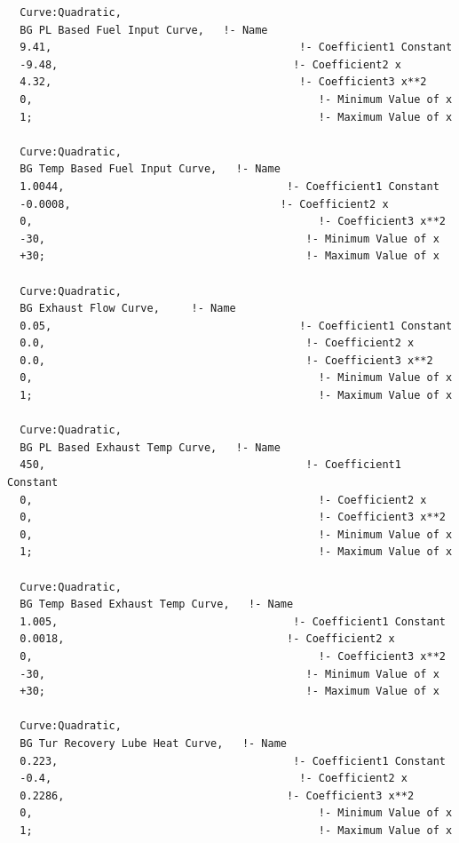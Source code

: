 \begin{lstlisting}
  Curve:Quadratic,
  BG PL Based Fuel Input Curve,   !- Name
  9.41,                                       !- Coefficient1 Constant
  -9.48,                                     !- Coefficient2 x
  4.32,                                       !- Coefficient3 x**2
  0,                                             !- Minimum Value of x
  1;                                             !- Maximum Value of x

  Curve:Quadratic,
  BG Temp Based Fuel Input Curve,   !- Name
  1.0044,                                   !- Coefficient1 Constant
  -0.0008,                                 !- Coefficient2 x
  0,                                             !- Coefficient3 x**2
  -30,                                         !- Minimum Value of x
  +30;                                         !- Maximum Value of x

  Curve:Quadratic,
  BG Exhaust Flow Curve,     !- Name
  0.05,                                       !- Coefficient1 Constant
  0.0,                                         !- Coefficient2 x
  0.0,                                         !- Coefficient3 x**2
  0,                                             !- Minimum Value of x
  1;                                             !- Maximum Value of x

  Curve:Quadratic,
  BG PL Based Exhaust Temp Curve,   !- Name
  450,                                         !- Coefficient1 Constant
  0,                                             !- Coefficient2 x
  0,                                             !- Coefficient3 x**2
  0,                                             !- Minimum Value of x
  1;                                             !- Maximum Value of x

  Curve:Quadratic,
  BG Temp Based Exhaust Temp Curve,   !- Name
  1.005,                                     !- Coefficient1 Constant
  0.0018,                                   !- Coefficient2 x
  0,                                             !- Coefficient3 x**2
  -30,                                         !- Minimum Value of x
  +30;                                         !- Maximum Value of x

  Curve:Quadratic,
  BG Tur Recovery Lube Heat Curve,   !- Name
  0.223,                                     !- Coefficient1 Constant
  -0.4,                                       !- Coefficient2 x
  0.2286,                                   !- Coefficient3 x**2
  0,                                             !- Minimum Value of x
  1;                                             !- Maximum Value of x
\end{lstlisting}

